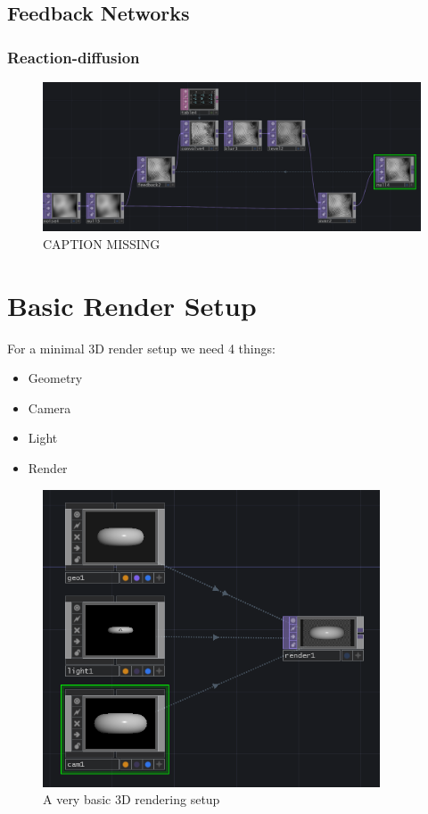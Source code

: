 \subsection{Feedback Networks}

\subsubsection{Reaction-diffusion}

\begin{figure}[H]
  \centering
  \includegraphics[width=\textwidth]{img/reactDiffuse.PNG}
  \caption[shortCaption]
  {CAPTION MISSING}
  \label{fig:label}
\end{figure}


\section{Basic Render Setup}
For a minimal 3D render setup we need 4 things:
\begin{itemize}
	\item Geometry \COMP
	\item Camera \COMP
	\item Light \COMP
	\item Render \TOP
\end{itemize}

\begin{figure}[H]
  \centering
  \includegraphics[width=10cm]{img/rendreSetup.PNG}
  \caption[render setup]
  {A very basic 3D rendering setup}
  \label{fig:label}
\end{figure}


